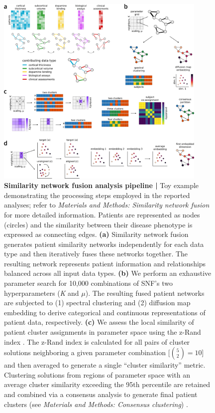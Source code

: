 \documentclass[12pt,aps,pra,reprint,showkeys]{revtex4-1}
\begin{document}
\begin{figure}[t]
  \begin{center}
    \centerline{\includegraphics[width=0.90\textwidth]{network_creation.pdf}}
    \caption{
      \textbf{Similarity network fusion analysis pipeline |}
      Toy example demonstrating the processing steps employed in the reported analyses; refer to \textit{Materials and Methods: Similarity network fusion} for more detailed information.
      Patients are represented as nodes (circles) and the similarity between their disease phenotype is expressed as connecting edges.
      \textbf{(a)} Similarity network fusion generates patient similarity networks independently for each data type and then iteratively fuses these networks together.
      The resulting network represents patient information and relationships balanced across all input data types.
      \textbf{(b)} We perform an exhaustive parameter search for 10,000 combinations of SNF's two hyperparameters (\emph{K} and $\mu$).
      The resulting fused patient networks are subjected to (1) spectral clustering and (2) diffusion map embedding to derive categorical and continuous representations of patient data, respectively.
      \textbf{(c)} We assess the local similarity of patient cluster assignments in parameter space using the z-Rand index \citep{traud2011comparing}.
      The z-Rand index is calculated for all pairs of cluster solutions neighboring a given parameter combination [$\binom{5}{2} = 10$] and then averaged to generate a single ``cluster similarity'' metric.
      Clustering solutions from regions of parameter space with an average cluster similarity exceeding the 95th percentile are retained and combined via a consensus analysis to generate final patient clusters (see \emph{Materials and Methods: Consensus clustering}) \citep{bassett2013robust, lancichinetti2012consensus}.
}
\end{center}
\end{figure}
\end{document}
